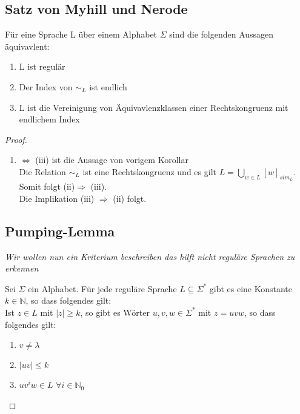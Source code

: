 \subsection{Satz von Myhill und Nerode}
    Für eine Sprache L über einem Alphabet \(\Sigma\) sind die folgenden Aussagen äquivavlent:
    \begin{enumerate}[label=(\roman*)]
        \item L ist regulär 
        \item Der Index von \(\sim_L\) ist endlich
        \item L ist die Vereinigung von Äquivavlenzklassen einer Rechtskongruenz mit endlichem Index 
    \end{enumerate}
    \begin{proof}
        \begin{enumerate}[label=(\roman*)]
            \item \(\Leftrightarrow\) (iii) ist die Aussage von vorigem Korollar\\
            Die Relation \(\sim_L\) ist eine Rechtskongruenz und es gilt \(L=\bigcup_{w\in L}[w]_{sim_L}\). Somit folgt (ii)\(\Rightarrow\) (iii).\\
            Die Implikation (iii) \(\Rightarrow\) (ii) folgt.
        \end{enumerate}
\subsection{Pumping-Lemma}
    \textit{Wir wollen nun ein Kriterium beschreiben das hilft nicht reguläre Sprachen zu erkennen}\par\bigskip
    Sei \(\Sigma\) ein Alphabet. Für jede reguläre Sprache \(L\subseteq\Sigma^*\) gibt es eine Konstante \(k\in\mathbb{N}\), so dass folgendes gilt:\\
    Ist \(z\in L\) mit \(|z|\geq k\), so gibt es Wörter \(u,v,w\in\Sigma^*\) mit \(z=uvw\), so dass folgendes gilt:
    \begin{enumerate}[label=(\roman*)]
        \item \(v\not=\lambda\)
        \item \(|uv|\leq k\)
        \item \(uv^iw\in L\) \(\forall i\in\mathbb{N}_0\)
    \end{enumerate} 
    \end{proof}
